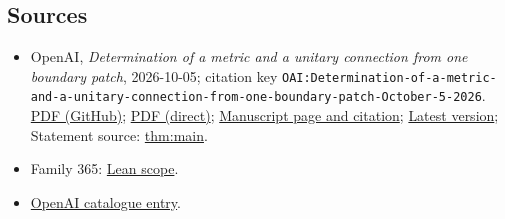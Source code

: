 \documentclass[11pt]{article}
\begin{document}
\subsection{Sources}
\begin{itemize}
\item OpenAI, \emph{Determination of a metric and a unitary connection from one boundary patch}, 2026-10-05; citation key \texttt{OAI:Determination-of-a-metric-and-a-unitary-connection-from-one-boundary-patch-October-5-2026}. \href{https://github.com/openai/math/blob/adc7f1241b42e322a6451854ab7e4b4c146bf78a/preprints/Determination-of-a-metric-and-a-unitary-connection-from-one-boundary-patch-October-5-2026/paper.pdf}{PDF (GitHub)}; \href{https://github.com/openai/math/raw/adc7f1241b42e322a6451854ab7e4b4c146bf78a/preprints/Determination-of-a-metric-and-a-unitary-connection-from-one-boundary-patch-October-5-2026/paper.pdf}{PDF (direct)}; \href{https://github.com/openai/math/blob/adc7f1241b42e322a6451854ab7e4b4c146bf78a/preprints/Determination-of-a-metric-and-a-unitary-connection-from-one-boundary-patch-October-5-2026/README.md}{Manuscript page and citation}; \href{https://github.com/openai/math/blob/main/preprints/Determination-of-a-metric-and-a-unitary-connection-from-one-boundary-patch-October-5-2026/paper.pdf}{Latest version}; Statement source: \href{https://github.com/openai/math/blob/adc7f1241b42e322a6451854ab7e4b4c146bf78a/preprints/Determination-of-a-metric-and-a-unitary-connection-from-one-boundary-patch-October-5-2026/build/sections/01-introduction.tex\#L39}{thm:main}.
\item Family 365: \href{https://github.com/openai/math/blob/adc7f1241b42e322a6451854ab7e4b4c146bf78a/lean/docs/365.md}{Lean scope}.
\item \href{https://github.com/openai/math/blob/adc7f1241b42e322a6451854ab7e4b4c146bf78a/CONTENTS.md}{OpenAI catalogue entry}.
\end{itemize}
\end{document}
